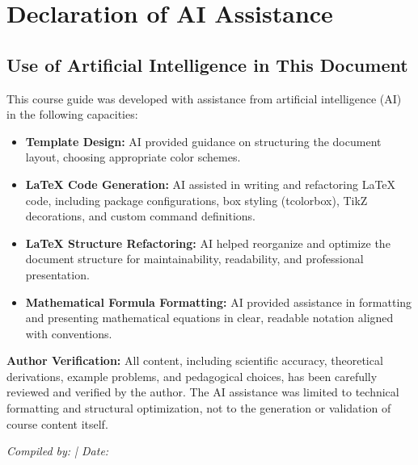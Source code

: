 

\chapter{Declaration of AI Assistance}

\section{Use of Artificial Intelligence in This Document}

This course guide was developed with assistance from artificial intelligence (AI)
in the following capacities:

\begin{itemize}
  \item \textbf{Template Design:} AI provided guidance on structuring the document layout,
        choosing appropriate color schemes.

  \item \textbf{LaTeX Code Generation:} AI assisted in writing and refactoring LaTeX code,
        including package configurations, box styling (tcolorbox), TikZ decorations,
        and custom command definitions.

  \item \textbf{LaTeX Structure Refactoring:} AI helped reorganize and optimize the document
        structure for maintainability, readability, and professional presentation.

  \item \textbf{Mathematical Formula Formatting:} AI provided assistance in formatting and
        presenting mathematical equations in clear, readable notation aligned with
        conventions.
\end{itemize}

\bigskip\noindent
\textbf{Author Verification:} All content, including scientific accuracy, theoretical derivations,
example problems, and pedagogical choices, has been carefully reviewed and verified by the author.
The AI assistance was limited to technical formatting and structural optimization, not to
the generation or validation of course content itself.

\bigskip\noindent
\textit{Compiled by: \NoteAuthor \quad | \quad Date: \CompileDate}

\clearpage

